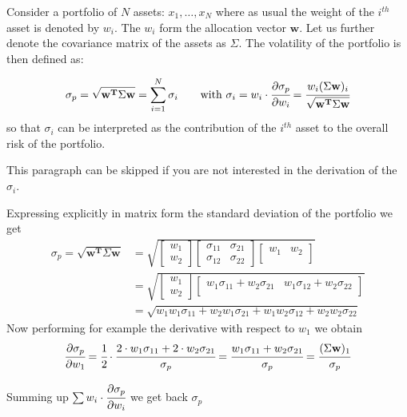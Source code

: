 Consider a portfolio of \(N\) assets: \(x_{1}, \ldots, x_N\) where as
usual the weight of the $i^{th}$ asset is denoted by \(w_{i}\). The
\(w_{i}\) form the allocation vector \(\mathbf{w}\). Let us further
denote the covariance matrix of the assets as \(\Sigma\). The volatility
of the portfolio is then defined as:

\[ \sigma_p={\sqrt {\mathbf{w^T}\Sigma \mathbf{w}}} = \sum_{i=1}^{N}\sigma _{i}\qquad\textrm{with}~\sigma _{i} = w_{i}\cdot \cfrac{\partial\sigma_p}{\partial w_{i}}={\cfrac {w_{i}(\Sigma \mathbf{w})_{i}}{\sqrt {\mathbf{w^T}\Sigma \mathbf{w}}}}\]
so that \(\sigma _{i}\) can be interpreted as the contribution of the $i^{th}$ asset to the overall risk of the portfolio.

\begin{tcolorbox}[breakable, size=fbox, boxrule=1pt, pad at break*=1mm,colback=cream, colframe=cellborder]
This paragraph can be skipped if you are not interested in the derivation of the $\sigma_i$.

Expressing explicitly in matrix form the standard deviation of the portfolio we get
\[
\begin{split}
	\sigma_p={\sqrt {\mathbf{w^T}\Sigma \mathbf{w}}} & =
	\sqrt{
		\begin{bmatrix}
			w_{1} \\
			w_{2}
		\end{bmatrix}
		\begin{bmatrix}
			\sigma_{11} & \sigma_{21} \\
			\sigma_{12} & \sigma_{22} 
		\end{bmatrix}
		\begin{bmatrix}
			w_{1} & w_{2} \\
		\end{bmatrix}
	}\\
	&=
	\sqrt{
		\begin{bmatrix}
			w_{1} \\
			w_{2}
		\end{bmatrix}
		\begin{bmatrix}
			w_{1}\sigma_{11} + w_{2}\sigma_{21} & w_{1}\sigma_{12} + w_{2}\sigma_{22} \\
		\end{bmatrix}
	} \\
	&= \sqrt{
		w_{1}w_{1}\sigma_{11} + w_{2}w_{1}\sigma_{21} + w_{1}w_{2}\sigma_{12} + w_{2}w_{2}\sigma_{22} }
\end{split}
\]
Now performing for example the derivative with respect to $w_1$ we obtain
\[\cfrac{\partial\sigma_p}{\partial w_1} = \cfrac{1}{2}\cdot\cfrac{2\cdot w_1\sigma_{11} + 2\cdot w_{2}\sigma_{21}}{\sigma_p} = \cfrac{w_1\sigma_{11} + w_{2}\sigma_{21}}{\sigma_p} = \cfrac{(\Sigma \mathbf{w})_{1}}{\sigma_p}\]

Summing up $\sum w_i\cdot\cfrac{\partial\sigma_p}{\partial w_i}$ we get back $\sigma_p$
\end{tcolorbox}

